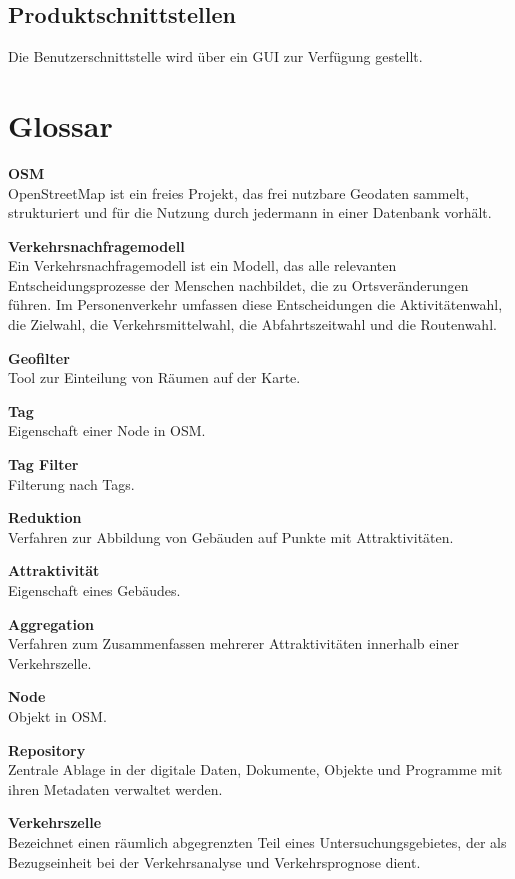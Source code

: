 \documentclass[parskip=full]{scrartcl} %
\begin{document}
\subsection{Produktschnittstellen}
Die Benutzerschnittstelle wird über ein GUI zur Verfügung gestellt.

\newpage
\section{Glossar}
\textbf{OSM}\\
OpenStreetMap ist ein freies Projekt, das frei nutzbare Geodaten sammelt, strukturiert und für die Nutzung durch jedermann in einer Datenbank vorhält.

\textbf{Verkehrsnachfragemodell}\\
Ein Verkehrsnachfragemodell ist ein Modell, das alle relevanten Entscheidungsprozesse der Menschen nachbildet, die zu Ortsveränderungen führen. Im Personenverkehr umfassen diese Entscheidungen die Aktivitätenwahl, die Zielwahl, die Verkehrsmittelwahl, die Abfahrtszeitwahl und die Routenwahl.

\textbf{Geofilter}\\
Tool zur Einteilung von Räumen auf der Karte.

\textbf{Tag}\\
Eigenschaft einer Node in OSM.

\textbf{Tag Filter}\\
Filterung nach Tags.

\textbf{Reduktion}\\
Verfahren zur Abbildung von Gebäuden auf Punkte mit Attraktivitäten.

\textbf{Attraktivität}\\
Eigenschaft eines Gebäudes.

\textbf{Aggregation}\\
Verfahren zum Zusammenfassen mehrerer Attraktivitäten innerhalb einer Verkehrszelle.

\textbf{Node}\\
Objekt in OSM.

\textbf{Repository}\\
Zentrale Ablage in der digitale Daten, Dokumente, Objekte und Programme mit ihren Metadaten verwaltet werden.

\textbf{Verkehrszelle}\\
Bezeichnet einen räumlich abgegrenzten Teil eines Untersuchungsgebietes, der als Bezugseinheit bei der Verkehrsanalyse und Verkehrsprognose dient.

\newpage
\end{document}
